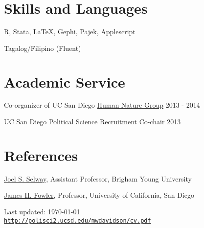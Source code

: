 \documentclass[letterpaper]{article}
\def\footerlink{http://polisci2.ucsd.edu/mwdavidson/cv.pdf}
\renewenvironment{itemize}{
  \begin{list}{}{
    \setlength{\leftmargin}{1.5em}
  }
}{
  \end{list}
}
\begin{document}
\section*{Skills and Languages}
\begin{itemize}
\item R, Stata, LaTeX, Gephi, Pajek, Applescript
\item Tagalog/Filipino (Fluent)
\end{itemize}

\section*{Academic Service}
\begin{itemize}
  \item Co-organizer of UC San Diego \href{http://hng.ucsd.edu/index.html}{Human Nature Group} \hfill 2013 - 2014
  \item UC San Diego Political Science Recruitment Co-chair \hfill 2013
\end{itemize}


\section*{References}
\begin{itemize}
\item \href{https://sites.google.com/site/joelsawatselway/}{Joel S. Selway}, Assistant Professor, Brigham Young University
\item \href{jhfowler.ucsd.edu}{James H. Fowler}, Professor, University of California, San Diego
\end{itemize}

\bigskip
\begin{center}
  \begin{footnotesize}
    Last updated: \today \\
    \href{\footerlink}{\texttt{\footerlink}}
  \end{footnotesize}
\end{center}
\end{document}
